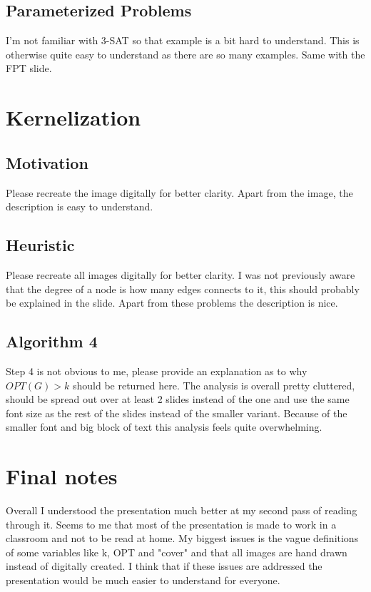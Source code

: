 \documentclass[11pt, a4paper]{article}
\begin{document}
\subsection{Parameterized Problems}
I'm not familiar with 3-SAT so that example is a bit hard to understand.
\newline
This is otherwise quite easy to understand as there are so many examples.
Same with the FPT slide.

\section{Kernelization}
\subsection{Motivation}
Please recreate the image digitally for better clarity.
Apart from the image, the description is easy to understand.

\subsection{Heuristic}
Please recreate all images digitally for better clarity.
I was not previously aware that the degree of a node is how many edges connects to it, this should probably
be explained in the slide.
Apart from these problems the description is nice.

\subsection{Algorithm 4}
Step 4 is not obvious to me, please provide an explanation as to why $OPT(G)>k$ should be returned here.
The analysis is overall pretty cluttered, should be spread out over at least 2 slides instead of the one and
use the same font size as the rest of the slides instead of the smaller variant.
Because of the smaller font and big block of text this analysis feels quite overwhelming.

\section{Final notes}
Overall I understood the presentation much better at my second pass of reading through it.
Seems to me that most of the presentation is made to work in a classroom and not to be read
at home. My biggest issues is the vague definitions of some variables like k, OPT and "cover"
and that all images are hand drawn instead of digitally created.
\newline
I think that if these issues are addressed the presentation would be much easier to understand for everyone.
\end{document}
